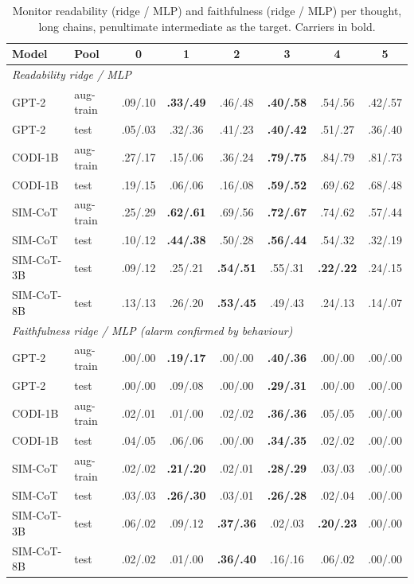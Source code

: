 \documentclass{article}
\begin{document}
\begin{table}[h]
\caption{Monitor readability (ridge / MLP) and faithfulness (ridge / MLP) per thought, long chains, penultimate intermediate as the target. Carriers in bold.}
\label{tab:monitors}
\centering
\scriptsize
\setlength{\tabcolsep}{3pt}
\begin{tabular}{llcccccc}
\toprule
Model & Pool & 0 & 1 & 2 & 3 & 4 & 5 \\
\midrule
\multicolumn{8}{l}{\emph{Readability ridge / MLP}} \\
GPT-2 & aug-train & .09/.10 & \textbf{.33/.49} & .46/.48 & \textbf{.40/.58} & .54/.56 & .42/.57 \\
GPT-2 & test & .05/.03 & .32/.36 & .41/.23 & \textbf{.40/.42} & .51/.27 & .36/.40 \\
CODI-1B & aug-train & .27/.17 & .15/.06 & .36/.24 & \textbf{.79/.75} & .84/.79 & .81/.73 \\
CODI-1B & test & .19/.15 & .06/.06 & .16/.08 & \textbf{.59/.52} & .69/.62 & .68/.48 \\
SIM-CoT & aug-train & .25/.29 & \textbf{.62/.61} & .69/.56 & \textbf{.72/.67} & .74/.62 & .57/.44 \\
SIM-CoT & test & .10/.12 & \textbf{.44/.38} & .50/.28 & \textbf{.56/.44} & .54/.32 & .32/.19 \\
SIM-CoT-3B & test & .09/.12 & .25/.21 & \textbf{.54/.51} & .55/.31 & \textbf{.22/.22} & .24/.15 \\
SIM-CoT-8B & test & .13/.13 & .26/.20 & \textbf{.53/.45} & .49/.43 & .24/.13 & .14/.07 \\
\midrule
\multicolumn{8}{l}{\emph{Faithfulness ridge / MLP (alarm confirmed by behaviour)}} \\
GPT-2 & aug-train & .00/.00 & \textbf{.19/.17} & .00/.00 & \textbf{.40/.36} & .00/.00 & .00/.00 \\
GPT-2 & test & .00/.00 & .09/.08 & .00/.00 & \textbf{.29/.31} & .00/.00 & .00/.00 \\
CODI-1B & aug-train & .02/.01 & .01/.00 & .02/.02 & \textbf{.36/.36} & .05/.05 & .00/.00 \\
CODI-1B & test & .04/.05 & .06/.06 & .00/.00 & \textbf{.34/.35} & .02/.02 & .00/.00 \\
SIM-CoT & aug-train & .02/.02 & \textbf{.21/.20} & .02/.01 & \textbf{.28/.29} & .03/.03 & .00/.00 \\
SIM-CoT & test & .03/.03 & \textbf{.26/.30} & .03/.01 & \textbf{.26/.28} & .02/.04 & .00/.00 \\
SIM-CoT-3B & test & .06/.02 & .09/.12 & \textbf{.37/.36} & .02/.03 & \textbf{.20/.23} & .00/.00 \\
SIM-CoT-8B & test & .02/.02 & .01/.00 & \textbf{.36/.40} & .16/.16 & .06/.02 & .00/.00 \\
\bottomrule
\end{tabular}
\end{table}
\end{document}
